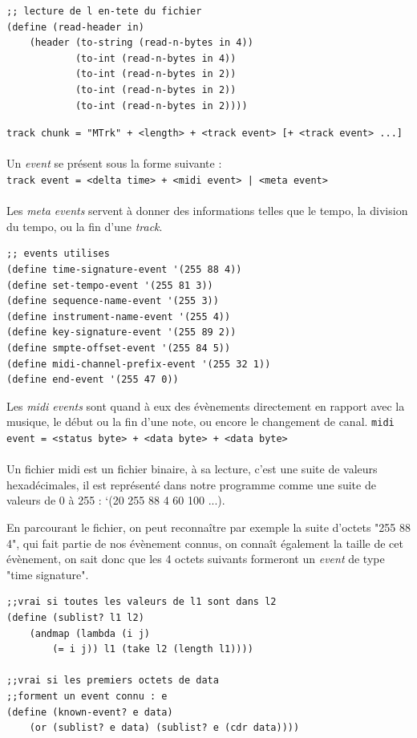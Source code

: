 \begin{lstlisting}[style=Scheme]
;; lecture de l en-tete du fichier
(define (read-header in)
    (header (to-string (read-n-bytes in 4))
            (to-int (read-n-bytes in 4))
            (to-int (read-n-bytes in 2))
            (to-int (read-n-bytes in 2))
            (to-int (read-n-bytes in 2))))
\end{lstlisting}
{\small \texttt{track chunk = "MTrk" + <length> + <track event> [+ <track event> ...]}}\\\\
Un \textit{event} se présent sous la forme suivante :\\
{\small \texttt{track event = <delta time> + <midi event> | <meta event>}}\\\\
Les \textit{meta events} servent à donner des informations telles que le tempo, la division du tempo, ou la fin d'une \textit{track}.\\

\begin{lstlisting}[style=Scheme]
;; events utilises
(define time-signature-event '(255 88 4))
(define set-tempo-event '(255 81 3))
(define sequence-name-event '(255 3))
(define instrument-name-event '(255 4))
(define key-signature-event '(255 89 2))
(define smpte-offset-event '(255 84 5))
(define midi-channel-prefix-event '(255 32 1))
(define end-event '(255 47 0))
\end{lstlisting}

Les \textit{midi events} sont quand à eux des évènements directement en rapport avec la musique, le début ou la fin d'une note, ou encore le changement de canal.
{\small \texttt{midi event = <status byte> + <data byte> + <data byte>}}\\\\
Un fichier midi est un fichier binaire, à sa lecture, c'est une suite de valeurs hexadécimales, il est représenté dans notre programme comme une suite de valeurs de 0 à 255 : ‘(20 255 88 4 60 100 ...).

En parcourant le fichier, on peut reconnaître par exemple la suite d'octets "255 88 4", qui fait partie de nos évènement connus, on connaît également la taille de cet évènement, on sait donc que les 4 octets suivants formeront un \textit{event} de type "time signature".\\

\begin{lstlisting}[style=Scheme]
;;vrai si toutes les valeurs de l1 sont dans l2
(define (sublist? l1 l2)
    (andmap (lambda (i j)
        (= i j)) l1 (take l2 (length l1))))

;;vrai si les premiers octets de data
;;forment un event connu : e
(define (known-event? e data)
    (or (sublist? e data) (sublist? e (cdr data))))
\end{lstlisting}

